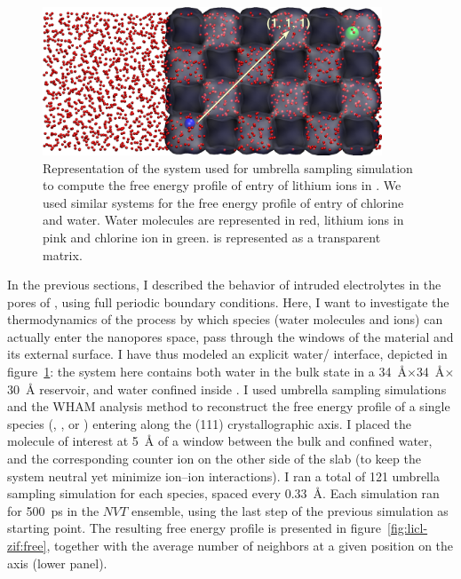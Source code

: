 \documentclass[thesis]{subfiles}
\begin{document}
\begin{figure}[ht]
    \centering
    \includegraphics[width=0.9\textwidth]{figures/images/licl-zif-umbrella}
    \caption{Representation of the system used for umbrella sampling simulation
    to compute the free energy profile of entry of lithium ions in . We
    used similar systems for the free energy profile of entry of chlorine and
    water. Water molecules are represented in red, lithium ions in pink and
    chlorine ion in green.  is represented as a transparent matrix.}
    \label{fig:licl-zif:umbrella-system}
\end{figure}

In the previous sections, I described the behavior of intruded electrolytes in
the pores of , using full periodic boundary conditions. Here, I want to
investigate the thermodynamics of the process by which species (water molecules
and ions) can actually enter the nanopores space, \emph{\ie} pass through the
windows of the material and its external surface. I have thus modeled an
explicit water/ interface, depicted in
figure~\ref{fig:licl-zif:umbrella-system}: the system here contains both water
in the bulk state in a \SI{34}{\AA}$\times$\SI{34}{\AA}$\times$\SI{30}{\AA}
reservoir, and water confined inside . I used umbrella sampling simulations
and the WHAM analysis method\cite{WHAM} to reconstruct the free energy profile
of a single species (, , or ) entering  along the
(111) crystallographic axis. I placed the molecule of interest at \SI{5}{\AA} of
a window between the bulk and confined water, and the corresponding counter ion
on the other side of the  slab (to keep the system neutral yet minimize
ion--ion interactions). I ran a total of 121 umbrella sampling simulation for
each species, spaced every \SI{0.33}{\AA}. Each simulation ran for \SI{500}{ps}
in the $NVT$ ensemble, using the last step of the previous simulation as
starting point. The resulting free energy profile is presented in
figure~\ref{fig:licl-zif:free}, together with the average number of neighbors at
a given position on the axis (lower panel).
\end{document}
